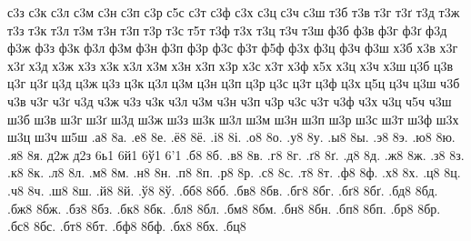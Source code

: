 {с3з
с3к
с3л
с3м
с3н
с3п
с3р
с5с
с3т
с3ф
с3х
с3ц
с3ч
с3ш
т3б
т3в
т3г
т3ґ
т3д
т3ж
т3з
т3к
т3л
т3м
т3н
т3п
т3р
т3с
т5т
т3ф
т3х
т3ц
т3ч
т3ш
ф3б
ф3в
ф3г
ф3ґ
ф3д
ф3ж
ф3з
ф3к
ф3л
ф3м
ф3н
ф3п
ф3р
ф3с
ф3т
ф5ф
ф3х
ф3ц
ф3ч
ф3ш
х3б
х3в
х3г
х3ґ
х3д
х3ж
х3з
х3к
х3л
х3м
х3н
х3п
х3р
х3с
х3т
х3ф
х5х
х3ц
х3ч
х3ш
ц3б
ц3в
ц3г
ц3ґ
ц3д
ц3ж
ц3з
ц3к
ц3л
ц3м
ц3н
ц3п
ц3р
ц3с
ц3т
ц3ф
ц3х
ц5ц
ц3ч
ц3ш
ч3б
ч3в
ч3г
ч3ґ
ч3д
ч3ж
ч3з
ч3к
ч3л
ч3м
ч3н
ч3п
ч3р
ч3с
ч3т
ч3ф
ч3х
ч3ц
ч5ч
ч3ш
ш3б
ш3в
ш3г
ш3ґ
ш3д
ш3ж
ш3з
ш3к
ш3л
ш3м
ш3н
ш3п
ш3р
ш3с
ш3т
ш3ф
ш3х
ш3ц
ш3ч
ш5ш
%
%
%
.а8
8а.
.е8
8е.
.ё8
8ё.
.і8
8і.
.о8
8о.
.у8
8у.
.ы8
8ы.
.э8
8э.
.ю8
8ю.
.я8
8я.
%
%
%
%
%
д2ж
д2з
%
%
6ь1
6й1
6ў1
6'1
%
%
.б8
8б.
.в8
8в.
.г8
8г.
.ґ8
8ґ.
.д8
8д.
.ж8
8ж.
.з8
8з.
.к8
8к.
.л8
8л.
.м8
8м.
.н8
8н.
.п8
8п.
.р8
8р.
.с8
8с.
.т8
8т.
.ф8
8ф.
.х8
8х.
.ц8
8ц.
.ч8
8ч.
.ш8
8ш.
.й8
8й.
.ў8
8ў.
.бб8
8бб.
.бв8
8бв.
.бг8
8бг.
.бґ8
8бґ.
.бд8
8бд.
.бж8
8бж.
.бз8
8бз.
.бк8
8бк.
.бл8
8бл.
.бм8
8бм.
.бн8
8бн.
.бп8
8бп.
.бр8
8бр.
.бс8
8бс.
.бт8
8бт.
.бф8
8бф.
.бх8
8бх.
.бц8
}
